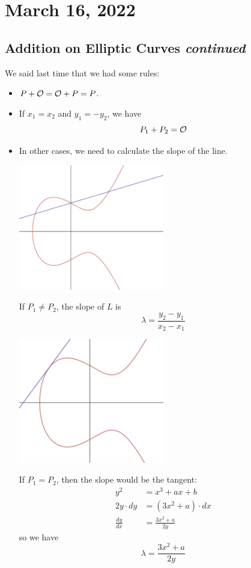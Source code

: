 \section{March 16, 2022}
\subsection{Addition on Elliptic Curves \emph{continued}}
We said last time that we had some rules:
\begin{itemize}
    \item $P + \mathcal{O} = \mathcal{O} + P = P$.
    \item If $x_1 = x_2$ and $y_1 = -y_2$, we have
          \[P_1 + P_2 = \mathcal{O}\]
    \item
          In other cases, we need to calculate the slope of the line.
          \begin{center}
              \includegraphics[width=0.5\textwidth]{images/ec_two_intersection.png}
          \end{center}
          If $P_1\neq P_2$, the slope of $L$ is
          \[\lambda = \frac{y_2-y_1}{x_2-x_1}\]
          \begin{center}
              \includegraphics[width=0.5\textwidth]{images/ec_tangent.png}
          \end{center}
          If $P_1 = P_2$, then the slope would be the tangent:
          \begin{align*}
              y^2           & = x^3 + ax + b      \\
              2y\cdot dy    & = (3x^2+a)\cdot dx  \\
              \frac{dy}{dx} & = \frac{3x^2+a}{2y}
          \end{align*}
          so we have
          \[\lambda = \frac{3x^2+a}{2y}\]


\end{itemize}
